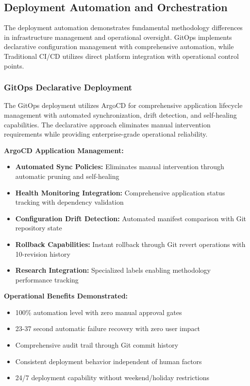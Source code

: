 \subsection{Deployment Automation and Orchestration}

The deployment automation demonstrates fundamental methodology differences in infrastructure management and operational oversight. GitOps implements declarative configuration management with comprehensive automation, while Traditional CI/CD utilizes direct platform integration with operational control points.

\subsubsection{GitOps Declarative Deployment}

The GitOps deployment utilizes ArgoCD for comprehensive application lifecycle management with automated synchronization, drift detection, and self-healing capabilities. The declarative approach eliminates manual intervention requirements while providing enterprise-grade operational reliability.

\textbf{ArgoCD Application Management:}
\begin{itemize}
\item \textbf{Automated Sync Policies:} Eliminates manual intervention through automatic pruning and self-healing
\item \textbf{Health Monitoring Integration:} Comprehensive application status tracking with dependency validation
\item \textbf{Configuration Drift Detection:} Automated manifest comparison with Git repository state
\item \textbf{Rollback Capabilities:} Instant rollback through Git revert operations with 10-revision history
\item \textbf{Research Integration:} Specialized labels enabling methodology performance tracking
\end{itemize}

\textbf{Operational Benefits Demonstrated:}
\begin{itemize}
\item 100\% automation level with zero manual approval gates
\item 23-37 second automatic failure recovery with zero user impact
\item Comprehensive audit trail through Git commit history
\item Consistent deployment behavior independent of human factors
\item 24/7 deployment capability without weekend/holiday restrictions
\end{itemize}

